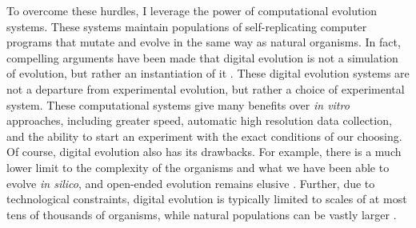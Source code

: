 To overcome these hurdles, I leverage the power of computational evolution systems.
These systems maintain populations of self-replicating computer programs that mutate and evolve in the same way as natural organisms.
In fact, compelling arguments have been made that digital evolution is not a simulation of evolution, but rather an instantiation of it \citep{pennockModelsSimulationsInstantiations2007}.
These digital evolution systems are not a departure from experimental evolution, but rather a choice of experimental system. 
These computational systems give many benefits over \textit{in vitro} approaches, including greater speed, automatic high resolution data collection, and the ability to start an experiment with the exact conditions of our choosing.
Of course, digital evolution also has its drawbacks. 
For example, there is a much lower limit to the complexity of the organisms and what we have been able to evolve \textit{in silico}, and open-ended evolution remains elusive \citep{taylorOpenEndedEvolutionPerspectives2016}.
Further, due to technological constraints, digital evolution is typically limited to scales of at most tens of thousands of organisms, while natural populations can be vastly larger \citep{morenoTrackableAgentbasedEvolution2024}.

